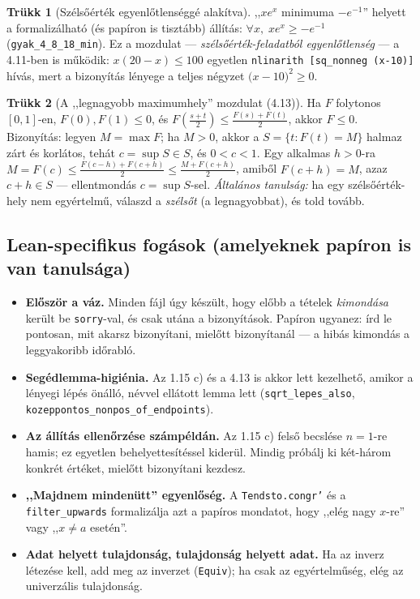 \documentclass[11pt,a4paper]{article}
\newcommand{\lean}[1]{\texttt{\small #1}}
\theoremstyle{definition}
\newtheorem{trukk}{Trükk}
\begin{document}
\begin{trukk}[Szélsőérték egyenlőtlenséggé alakítva]
,,$x e^x$ minimuma $-e^{-1}$'' helyett a formalizálható (és papíron is
tisztább) állítás: $\forall x,\; x e^x \ge -e^{-1}$
(\lean{gyak\_4\_8\_18\_min}). Ez a mozdulat --- \emph{szélsőérték-feladatból
egyenlőtlenség} --- a 4.11-ben is működik: $x(20-x)\le100$ egyetlen
\lean{nlinarith [sq\_nonneg (x-10)]} hívás, mert a bizonyítás lényege
a teljes négyzet $\big(x-10\big)^2 \ge 0$.
\end{trukk}

\begin{trukk}[A ,,legnagyobb maximumhely'' mozdulat (4.13)]
Ha $F$ folytonos $[0,1]$-en, $F(0),F(1)\le0$, és
$F\!\left(\frac{s+t}{2}\right)\le\frac{F(s)+F(t)}2$, akkor $F\le0$.
Bizonyítás: legyen $M = \max F$; ha $M>0$, akkor a
$S=\{t : F(t)=M\}$ halmaz zárt és korlátos, tehát $c=\sup S \in S$, és
$0<c<1$. Egy alkalmas $h>0$-ra
$M = F(c) \le \frac{F(c-h)+F(c+h)}2 \le \frac{M + F(c+h)}2$,
amiből $F(c+h)=M$, azaz $c+h\in S$ --- ellentmondás $c=\sup S$-sel.
\emph{Általános tanulság:} ha egy szélsőérték-hely nem egyértelmű, válaszd
a \emph{szélsőt} (a legnagyobbat), és told tovább.
\end{trukk}

\subsection{Lean-specifikus fogások (amelyeknek papíron is van tanulsága)}

\begin{itemize}
  \item \textbf{Először a váz.} Minden fájl úgy készült, hogy előbb a
    tételek \emph{kimondása} került be \lean{sorry}-val, és csak utána a
    bizonyítások. Papíron ugyanez: írd le pontosan, mit akarsz bizonyítani,
    mielőtt bizonyítanál --- a hibás kimondás a leggyakoribb időrabló.
  \item \textbf{Segédlemma-higiénia.} Az 1.15 c) és a 4.13 is akkor lett
    kezelhető, amikor a lényegi lépés önálló, névvel ellátott lemma lett
    (\lean{sqrt\_lepes\_also}, \lean{kozeppontos\_nonpos\_of\_endpoints}).
  \item \textbf{Az állítás ellenőrzése számpéldán.} Az 1.15 c) felső becslése
    $n=1$-re hamis; ez egyetlen behelyettesítéssel kiderül. Mindig próbálj
    ki két-három konkrét értéket, mielőtt bizonyítani kezdesz.
  \item \textbf{,,Majdnem mindenütt'' egyenlőség.} A \lean{Tendsto.congr'} és
    a \lean{filter\_upwards} formalizálja azt a papíros mondatot, hogy
    ,,elég nagy $x$-re'' vagy ,,$x\ne a$ esetén''.
  \item \textbf{Adat helyett tulajdonság, tulajdonság helyett adat.} Ha az
    inverz létezése kell, add meg az inverzet (\lean{Equiv}); ha csak az
    egyértelműség, elég az univerzális tulajdonság.
\end{itemize}
\end{document}
